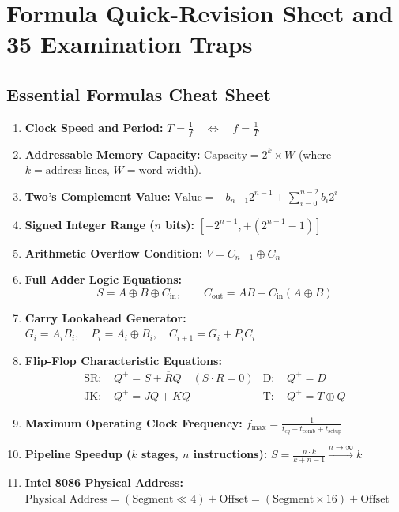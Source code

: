 \section{Formula Quick-Revision Sheet and 35 Examination Traps}
\label{sec:formula_cheat_sheet}

\subsection{Essential Formulas Cheat Sheet}
\begin{enumerate}[label=\bfseries\arabic*.]
    \item \textbf{Clock Speed and Period:} $T = \frac{1}{f} \quad \Longleftrightarrow \quad f = \frac{1}{T}$
    \item \textbf{Addressable Memory Capacity:} $\text{Capacity} = 2^k \times W$ (where $k = \text{address lines}$, $W = \text{word width}$).
    \item \textbf{Two's Complement Value:} $\text{Value} = -b_{n-1} 2^{n-1} + \sum_{i=0}^{n-2} b_i 2^i$
    \item \textbf{Signed Integer Range ($n$ bits):} $[-2^{n-1}, +(2^{n-1} - 1)]$
    \item \textbf{Arithmetic Overflow Condition:} $V = C_{n-1} \oplus C_n$
    \item \textbf{Full Adder Logic Equations:}
    \[ S = A \oplus B \oplus C_{\text{in}}, \qquad C_{\text{out}} = AB + C_{\text{in}}(A \oplus B) \]
    \item \textbf{Carry Lookahead Generator:} $G_i = A_i B_i, \quad P_i = A_i \oplus B_i, \quad C_{i+1} = G_i + P_i C_i$
    \item \textbf{Flip-Flop Characteristic Equations:}
    \begin{align*}
    \text{SR: } & Q^+ = S + \overline{R}Q \quad (S \cdot R = 0) & \text{D: } & Q^+ = D \\
    \text{JK: } & Q^+ = J\overline{Q} + \overline{K}Q & \text{T: } & Q^+ = T \oplus Q
    \end{align*}
    \item \textbf{Maximum Operating Clock Frequency:} $f_{\text{max}} = \frac{1}{t_{cq} + t_{\text{comb}} + t_{\text{setup}}}$
    \item \textbf{Pipeline Speedup ($k$ stages, $n$ instructions):} $S = \frac{n \cdot k}{k + n - 1} \xrightarrow{n \to \infty} k$
    \item \textbf{Intel 8086 Physical Address:} $\text{Physical Address} = (\text{Segment} \ll 4) + \text{Offset} = (\text{Segment} \times 16) + \text{Offset}$

\end{enumerate}
